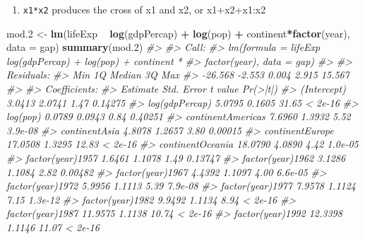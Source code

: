 \documentclass[]{book}
\newenvironment{Shaded}{\begin{snugshade}}{\end{snugshade}}
\newcommand{\KeywordTok}[1]{\textcolor[rgb]{0.13,0.29,0.53}{\textbf{#1}}}
\newcommand{\DataTypeTok}[1]{\textcolor[rgb]{0.13,0.29,0.53}{#1}}
\newcommand{\DecValTok}[1]{\textcolor[rgb]{0.00,0.00,0.81}{#1}}
\newcommand{\StringTok}[1]{\textcolor[rgb]{0.31,0.60,0.02}{#1}}
\newcommand{\CommentTok}[1]{\textcolor[rgb]{0.56,0.35,0.01}{\textit{#1}}}
\newcommand{\OperatorTok}[1]{\textcolor[rgb]{0.81,0.36,0.00}{\textbf{#1}}}
\newcommand{\NormalTok}[1]{#1}
\providecommand{\tightlist}{%
  \setlength{\itemsep}{0pt}\setlength{\parskip}{0pt}}
\begin{document}
\begin{enumerate}
\def\labelenumi{\arabic{enumi}.}
\setcounter{enumi}{1}
\tightlist
\item
  \texttt{x1*x2} produces the cross of x1 and x2, or x1+x2+x1:x2
\end{enumerate}

\begin{Shaded}
\begin{Highlighting}[]
\NormalTok{mod.}\DecValTok{2}\NormalTok{ <-}\StringTok{ }\KeywordTok{lm}\NormalTok{(lifeExp }\OperatorTok{~}\StringTok{ }\KeywordTok{log}\NormalTok{(gdpPercap) }\OperatorTok{+}\StringTok{ }\KeywordTok{log}\NormalTok{(pop) }\OperatorTok{+}\StringTok{ }\NormalTok{continent}\OperatorTok{*}\KeywordTok{factor}\NormalTok{(year), }\DataTypeTok{data =}\NormalTok{ gap)}
\KeywordTok{summary}\NormalTok{(mod.}\DecValTok{2}\NormalTok{)}
\CommentTok{#> }
\CommentTok{#> Call:}
\CommentTok{#> lm(formula = lifeExp ~ log(gdpPercap) + log(pop) + continent * }
\CommentTok{#>     factor(year), data = gap)}
\CommentTok{#> }
\CommentTok{#> Residuals:}
\CommentTok{#>     Min      1Q  Median      3Q     Max }
\CommentTok{#> -26.568  -2.553   0.004   2.915  15.567 }
\CommentTok{#> }
\CommentTok{#> Coefficients:}
\CommentTok{#>                                    Estimate Std. Error t value Pr(>|t|)}
\CommentTok{#> (Intercept)                          3.0413     2.0741    1.47  0.14275}
\CommentTok{#> log(gdpPercap)                       5.0795     0.1605   31.65  < 2e-16}
\CommentTok{#> log(pop)                             0.0789     0.0943    0.84  0.40251}
\CommentTok{#> continentAmericas                    7.6960     1.3932    5.52  3.9e-08}
\CommentTok{#> continentAsia                        4.8078     1.2657    3.80  0.00015}
\CommentTok{#> continentEurope                     17.0508     1.3295   12.83  < 2e-16}
\CommentTok{#> continentOceania                    18.0790     4.0890    4.42  1.0e-05}
\CommentTok{#> factor(year)1957                     1.6461     1.1078    1.49  0.13747}
\CommentTok{#> factor(year)1962                     3.1286     1.1084    2.82  0.00482}
\CommentTok{#> factor(year)1967                     4.4392     1.1097    4.00  6.6e-05}
\CommentTok{#> factor(year)1972                     5.9956     1.1113    5.39  7.9e-08}
\CommentTok{#> factor(year)1977                     7.9578     1.1124    7.15  1.3e-12}
\CommentTok{#> factor(year)1982                     9.9492     1.1134    8.94  < 2e-16}
\CommentTok{#> factor(year)1987                    11.9575     1.1138   10.74  < 2e-16}
\CommentTok{#> factor(year)1992                    12.3398     1.1146   11.07  < 2e-16}

\end{Highlighting}
\end{Shaded}
\end{document}
